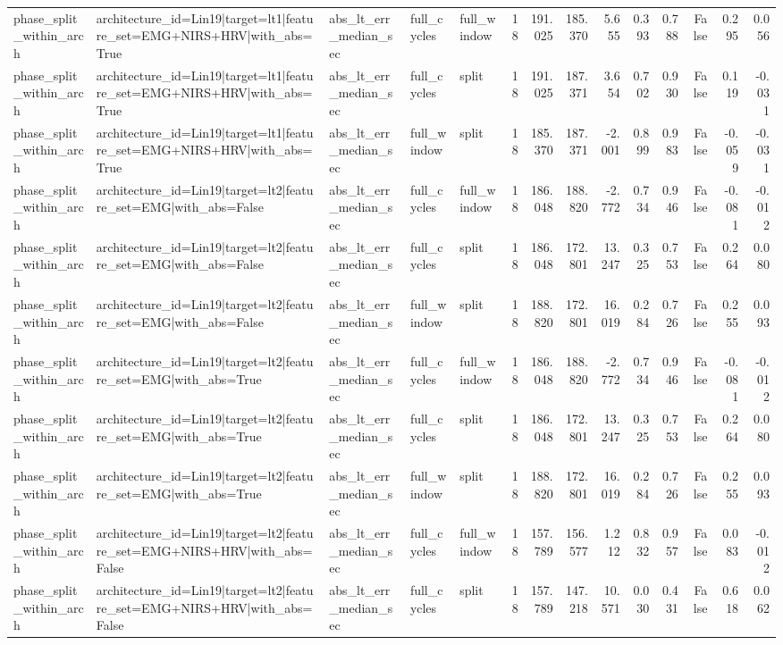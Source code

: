 \begin{table}
\begin{tabular}{lllllrrrrrrrrr}
phase_split_within_arch & architecture_id=Lin19|target=lt1|feature_set=EMG+NIRS+HRV|with_abs=True & abs_lt_err_median_sec & full_cycles & full_window & 18 & 191.025 & 185.370 & 5.655 & 0.393 & 0.788 & False & 0.295 & 0.056 \\
phase_split_within_arch & architecture_id=Lin19|target=lt1|feature_set=EMG+NIRS+HRV|with_abs=True & abs_lt_err_median_sec & full_cycles & split & 18 & 191.025 & 187.371 & 3.654 & 0.702 & 0.930 & False & 0.119 & -0.031 \\
phase_split_within_arch & architecture_id=Lin19|target=lt1|feature_set=EMG+NIRS+HRV|with_abs=True & abs_lt_err_median_sec & full_window & split & 18 & 185.370 & 187.371 & -2.001 & 0.899 & 0.983 & False & -0.059 & -0.031 \\
phase_split_within_arch & architecture_id=Lin19|target=lt2|feature_set=EMG|with_abs=False & abs_lt_err_median_sec & full_cycles & full_window & 18 & 186.048 & 188.820 & -2.772 & 0.734 & 0.946 & False & -0.081 & -0.012 \\
phase_split_within_arch & architecture_id=Lin19|target=lt2|feature_set=EMG|with_abs=False & abs_lt_err_median_sec & full_cycles & split & 18 & 186.048 & 172.801 & 13.247 & 0.325 & 0.753 & False & 0.264 & 0.080 \\
phase_split_within_arch & architecture_id=Lin19|target=lt2|feature_set=EMG|with_abs=False & abs_lt_err_median_sec & full_window & split & 18 & 188.820 & 172.801 & 16.019 & 0.284 & 0.726 & False & 0.255 & 0.093 \\
phase_split_within_arch & architecture_id=Lin19|target=lt2|feature_set=EMG|with_abs=True & abs_lt_err_median_sec & full_cycles & full_window & 18 & 186.048 & 188.820 & -2.772 & 0.734 & 0.946 & False & -0.081 & -0.012 \\
phase_split_within_arch & architecture_id=Lin19|target=lt2|feature_set=EMG|with_abs=True & abs_lt_err_median_sec & full_cycles & split & 18 & 186.048 & 172.801 & 13.247 & 0.325 & 0.753 & False & 0.264 & 0.080 \\
phase_split_within_arch & architecture_id=Lin19|target=lt2|feature_set=EMG|with_abs=True & abs_lt_err_median_sec & full_window & split & 18 & 188.820 & 172.801 & 16.019 & 0.284 & 0.726 & False & 0.255 & 0.093 \\
phase_split_within_arch & architecture_id=Lin19|target=lt2|feature_set=EMG+NIRS+HRV|with_abs=False & abs_lt_err_median_sec & full_cycles & full_window & 18 & 157.789 & 156.577 & 1.212 & 0.832 & 0.957 & False & 0.083 & -0.012 \\
phase_split_within_arch & architecture_id=Lin19|target=lt2|feature_set=EMG+NIRS+HRV|with_abs=False & abs_lt_err_median_sec & full_cycles & split & 18 & 157.789 & 147.218 & 10.571 & 0.030 & 0.431 & False & 0.618 & 0.062 \\

\end{tabular}
\end{table}
